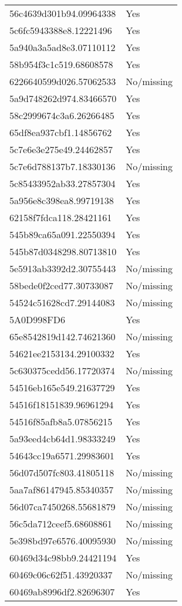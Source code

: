 \begin{tabular}{ll}
56c4639d301b94.09964338 & Yes \\
5c6fc5943388e8.12221496 & Yes \\
5a940a3a5ad8e3.07110112 & Yes \\
58b954f3c1c519.68608578 & Yes \\
6226640599d026.57062533 & No/missing \\
5a9d748262d974.83466570 & Yes \\
58c2999674c3a6.26266485 & Yes \\
65df8ea937cbf1.14856762 & Yes \\
5c7e6e3e275e49.24462857 & Yes \\
5c7e6d788137b7.18330136 & No/missing \\
5c85433952ab33.27857304 & Yes \\
5a956e8c398ea8.99719138 & Yes \\
62158f7fdca118.28421161 & Yes \\
545b89ca65a091.22550394 & Yes \\
545b87d0348298.80713810 & Yes \\
5e5913ab3392d2.30755443 & No/missing \\
58bede0f2ced77.30733087 & No/missing \\
54524c51628cd7.29144083 & No/missing \\
5A0D998FD6 & Yes \\
65e8542819d142.74621360 & No/missing \\
54621ee2153134.29100332 & Yes \\
5c630375cedd56.17720374 & No/missing \\
54516eb165e549.21637729 & Yes \\
54516f18151839.96961294 & Yes \\
54516f85afb8a5.07856215 & Yes \\
5a93eed4cb64d1.98333249 & Yes \\
54643cc19a6571.29983601 & Yes \\
56d07d507fc803.41805118 & No/missing \\
5aa7af86147945.85340357 & No/missing \\
56d07ca7450268.55681879 & No/missing \\
56c5da712ceef5.68608861 & No/missing \\
5e398bd97e6576.40095930 & No/missing \\
60469d34c98bb9.24421194 & Yes \\
60469c06c62f51.43920337 & No/missing \\
60469ab8996df2.82696307 & Yes \\

\end{tabular}
